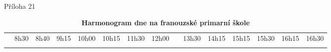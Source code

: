 \begin{landscape}
\begin{table}
Příloha 21\\
	\shorthandoff{-}
	\begin{tabular}{
	 p{1mm} 	%
	|p{6mm}
	|p{20mm}
	|p{25mm}
	|p{7mm}
	|p{30mm}
	|p{1mm} 	%
	|p{5mm} 	%
	|p{1mm} 	%
	|p{23mm}
	|p{30mm}
	|p{8mm}
	|p{23mm}
	|p{8mm}
	|p{8mm}}
		\multicolumn{1}{l}{} &
		\multicolumn{1}{l}{\hspace{-5mm}8h30} & 	%
		\multicolumn{1}{l}{\hspace{-5mm}8h40} &  	%
		\multicolumn{1}{l}{\hspace{-5mm}9h15} & 	%
		\multicolumn{1}{l}{\hspace{-9mm}10h00} &  	%
		\multicolumn{1}{l}{\hspace{-7mm}10h15} &  	%
		\multicolumn{1}{l}{\hspace{-8mm}11h30} &  	%
		\multicolumn{1}{l}{\hspace{0mm}12h00} &
		\multicolumn{1}{l}{} &
		\multicolumn{1}{l}{\hspace{-6mm}13h30} & 	%
		\multicolumn{1}{l}{\hspace{-8mm}14h15} & 	%
		\multicolumn{1}{l}{\hspace{-8mm}15h15} &  	%
		\multicolumn{1}{l}{\hspace{-8mm}15h30} & 	%
		\multicolumn{1}{l}{\hspace{-8mm}16h15} &  	%
		\multicolumn{1}{l}{\hspace{-8mm}16h30}  \\ 	%
		\cline{2-6}\cline{8-8}\cline{10-14}
		 & & & & \cellcolor{gray!50} & & & & & & &  \cellcolor{gray!50}& & &
		\multicolumn{1}{l}{} \\ [15mm]
		\cline{2-6}\cline{8-8}\cline{10-14}
	\end{tabular}
	\hfill
	\caption{\textbf{Harmonogram dne na franouzské primarní škole}}
	\label{tabulkaMS2}
\end{table}
\end{landscape}